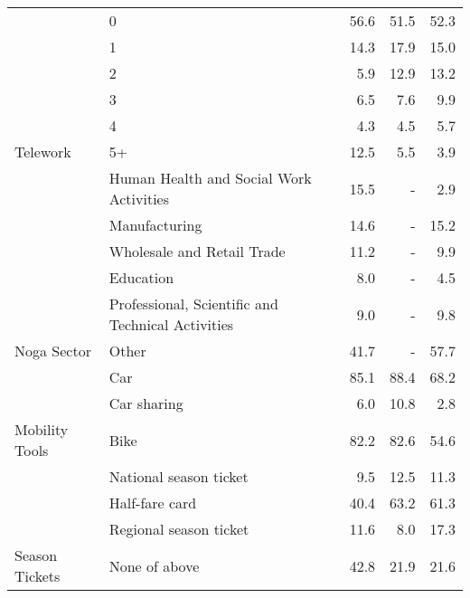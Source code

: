 \begin{table}
{\begin{tabular}{llrrr}
& 0 & 56.6 & 51.5 & 52.3\\
& 1 & 14.3 & 17.9 & 15.0\\
& 2 & 5.9 & 12.9 & 13.2\\
& 3 & 6.5 & 7.6 & 9.9\\
& 4 & 4.3 & 4.5 & 5.7\\
\multirow[t]{-6}{*}{\raggedright\arraybackslash Telework} & 5+ & 12.5 & 5.5 & 3.9\\
& Human Health and Social Work Activities & 15.5 & - & 2.9\\
& Manufacturing & 14.6 & - & 15.2\\
& Wholesale and Retail Trade & 11.2 & - & 9.9\\
& Education & 8.0 & - & 4.5\\
& Professional, Scientific and Technical Activities & 9.0 & - & 9.8\\
\multirow[t]{-6}{*}{\raggedright\arraybackslash Noga Sector} & Other & 41.7 & - & 57.7\\
& Car & 85.1 & 88.4 & 68.2\\
& Car sharing & 6.0 & 10.8 & 2.8\\
\multirow[t]{-3}{*}{\raggedright\arraybackslash Mobility Tools} & Bike & 82.2 & 82.6 & 54.6\\
& National season ticket & 9.5 & 12.5 & 11.3\\
& Half-fare card & 40.4 & 63.2 & 61.3\\
& Regional season ticket & 11.6 & 8.0 & 17.3\\
\multirow[t]{-4}{*}{\raggedright\arraybackslash Season Tickets} & None of above & 42.8 & 21.9 & 21.6\\
\bottomrule
\end{tabular}%
}
\end{table}
